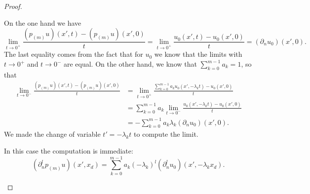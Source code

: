 \begin{proof}
\begin{subproof}
            On the one hand we have
            \begin{equation}
                \lim_{t\to 0^+} \frac{ (p_{(m)}u)(x',t)-(p_(m)u)(x',0) }{ t }=\lim_{t\to 0^+} \frac{ u_0(x',t)-u_0(x',0) }{ t }=(\partial_nu_0)(x',0).
            \end{equation}
            The last equality comes from the fact that for \( u_0\) we know that the limits with \( t\to 0^+\) and \( t\to 0^-\) are equal. On the other hand, we know that \( \sum_{k=0}^{m-1}a_k=1\), so that
            \begin{subequations}
                \begin{align}
                    \lim_{t\to 0^-} \frac{ (p_{(m)}u)(x',t)-(p_(m)u)(x',0) }{ t }&=\lim_{t\to 0^+} \frac{ \sum_{k=0}^{m-1}a_ku_0(x',-\lambda_kt)-u_0(x',0) }{ t }\\
                    &=\sum_{k=0}^{m-1}a_k\lim_{t\to 0^-} \frac{ u_0(x',-\lambda_kt)-u_0(x',0) }{ t }\\
                    &=-\sum_{k=0}^{m-1}a_k\lambda_k(\partial_n u_0)(x',0).
                \end{align}
            \end{subequations}
            We made the change of variable \( t'=-\lambda_kt\) to compute the limit.


            In this case the computation is immediate:
            \begin{equation}
                (\partial_n^lp_{(m)}u)(x',x_d)=\sum_{k=0}^{m-1}a_k(-\lambda_k)^l(\partial_n^lu_0)(x',-\lambda_kx_d).
            \end{equation}

        \spitem[Induction]


\end{subproof}
\end{proof}
